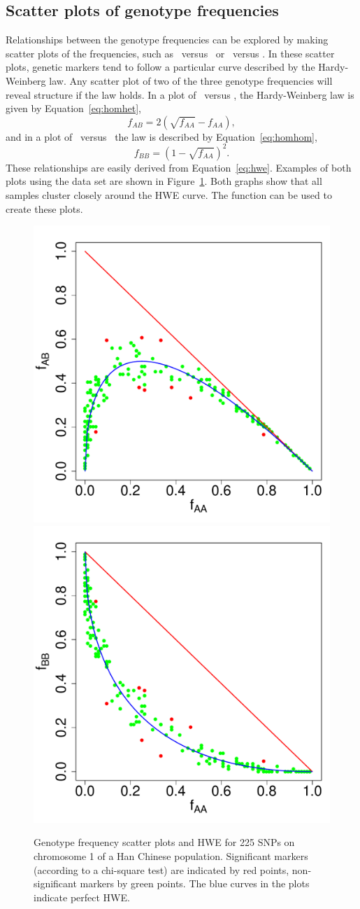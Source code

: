 \documentclass[nojss]{jss}
\begin{document}
\subsection{Scatter plots of genotype frequencies}
\label{subsec:scatter}
Relationships between the genotype frequencies can be explored by
making scatter plots of the frequencies, such as \fab\ versus \faa\ or
\fbb\ versus \faa.  In these scatter plots, genetic markers tend to
follow a particular curve described by the Hardy-Weinberg law.  Any
scatter plot of two of the three genotype frequencies will reveal
structure if the law holds. In a plot of \fab\ versus \faa, the
Hardy-Weinberg law is given by Equation~\ref{eq:homhet},
\begin{equation}
f_{AB} = 2 \left( \sqrt{f_{AA}} - f_{AA} \right),
\label{eq:homhet}
\end{equation}
and in a plot of \fbb\ versus \faa\ the law is described by
Equation~\ref{eq:homhom},
\begin{equation} 
f_{BB} = \left( 1 - \sqrt{f_{AA}} \right)^2.
\label{eq:homhom}
\end{equation}
These relationships are easily derived from
Equation~\ref{eq:hwe}. Examples of both plots using the
 data set are shown in Figure~\ref{fig:homhet}.
Both graphs show that all samples cluster closely around the HWE
curve. The function  can be used to create these
plots.
\begin{figure}[t!]
\centering
\includegraphics[width=.5\textwidth, trim=0 10 0 20, clip]{HWHapMapGeno1.pdf}%
\includegraphics[width=.5\textwidth, trim=0 10 0 20, clip]{HWHapMapGeno2.pdf}
\caption{Genotype frequency scatter plots and HWE for 225 SNPs on
  chromosome 1 of a Han Chinese population. Significant markers
  (according to a chi-square test) are indicated by red points,
  non-significant markers by green points.  The blue curves in the
  plots indicate perfect HWE.}\label{fig:homhet}
\end{figure}
\end{document}

